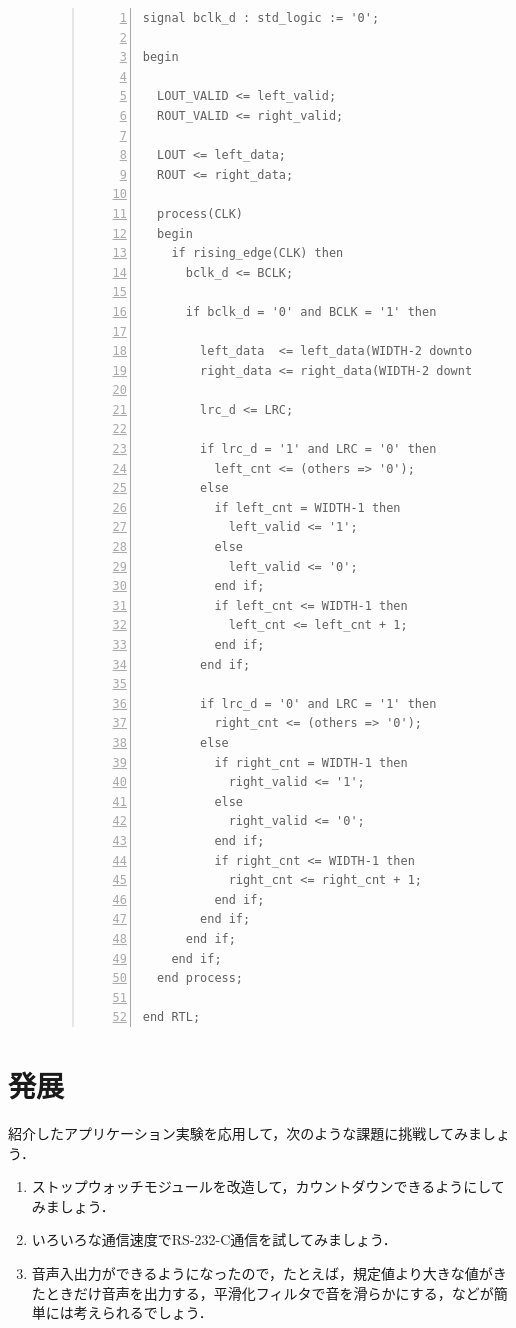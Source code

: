 \documentclass[a4paper,dvipdfmx]{jsarticle}
\begin{document}
\begin{figure}[H]
\begin{quote}
\begin{Verbatim}[frame=single, numbers=left, baselinestretch=0.8]
  signal bclk_d : std_logic := '0';

begin

  LOUT_VALID <= left_valid;
  ROUT_VALID <= right_valid;
  
  LOUT <= left_data;
  ROUT <= right_data;

  process(CLK)
  begin
    if rising_edge(CLK) then
      bclk_d <= BCLK;

      if bclk_d = '0' and BCLK = '1' then
        
        left_data  <= left_data(WIDTH-2 downto 0) & DAT;
        right_data <= right_data(WIDTH-2 downto 0) & DAT;

        lrc_d <= LRC;
        
        if lrc_d = '1' and LRC = '0' then
          left_cnt <= (others => '0');
        else
          if left_cnt = WIDTH-1 then
            left_valid <= '1';
          else
            left_valid <= '0';
          end if;
          if left_cnt <= WIDTH-1 then
            left_cnt <= left_cnt + 1;
          end if;
        end if;
        
        if lrc_d = '0' and LRC = '1' then
          right_cnt <= (others => '0');
        else
          if right_cnt = WIDTH-1 then
            right_valid <= '1';
          else
            right_valid <= '0';
          end if;
          if right_cnt <= WIDTH-1 then
            right_cnt <= right_cnt + 1;
          end if;
        end if;
      end if;
    end if;
  end process;

end RTL;
\end{Verbatim}
\end{quote}
\end{figure}

\section{発展}
紹介したアプリケーション実験を応用して，次のような課題に挑戦してみましょう．

\begin{enumerate}
 \item ストップウォッチモジュールを改造して，カウントダウンできるようにしてみましょう．
 \item いろいろな通信速度でRS-232-C通信を試してみましょう．
 \item 音声入出力ができるようになったので，たとえば，規定値より大きな値がきたときだけ音声を出力する，平滑化フィルタで音を滑らかにする，などが簡単には考えられるでしょう．
\end{enumerate}
\end{document}
